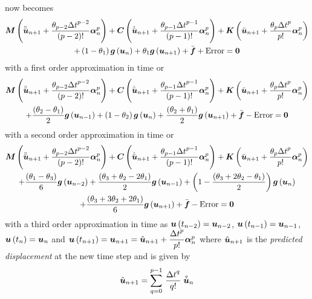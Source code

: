  now becomes
\begin{multline}
  \matr{M}\pbrac{\ddot{\bar{\vectr{u}}}_{n+1}+\dfrac{\theta_{p-2}{\Delta
        t}^{p-2}}{\factorial{p-2}}\vectr{\alpha}^{p}_{n}}+
  \matr{C}\pbrac{\dot{\bar{\vectr{u}}}_{n+1}+\dfrac{\theta_{p-1}{\Delta
        t}^{p-1}}{\factorial{p-1}}\vectr{\alpha}^{p}_{n}}
  +\matr{K}\pbrac{\bar{\vectr{u}}_{n+1}+\dfrac{\theta_{p}{\Delta
        t}^{p}}{p!}\vectr{\alpha}^{p}_{n}}\\
  +\pbrac{1-\theta_{1}}\fnof{\vectr{g}}{\vectr{u}_{n}}+\theta_{1}\fnof{\vectr{g}}{\vectr{u}_{n+1}}+\bar{\vectr{f}}+
  \text{Error}=\vectr{0}
  \label{eqn:firstorderdynamic2}
\end{multline}
with a first order approximation in time or 
\begin{multline}
  \matr{M}\pbrac{\ddot{\bar{\vectr{u}}}_{n+1}+\dfrac{\theta_{p-2}{\Delta
        t}^{p-2}}{\factorial{p-2}}\vectr{\alpha}^{p}_{n}}+
  \matr{C}\pbrac{\dot{\bar{\vectr{u}}}_{n+1}+\dfrac{\theta_{p-1}{\Delta
        t}^{p-1}}{\factorial{p-1}}\vectr{\alpha}^{p}_{n}}
  +\matr{K}\pbrac{\bar{\vectr{u}}_{n+1}+\dfrac{\theta_{p}{\Delta
        t}^{p}}{p!}\vectr{\alpha}^{p}_{n}}\\
  +\dfrac{\pbrac{\theta_{2}-\theta_{1}}}{2}\fnof{\vectr{g}}{\vectr{u}_{n-1}}+
  \pbrac{1-\theta_{2}}\fnof{\vectr{g}}{\vectr{u}_{n}}+
  \dfrac{\pbrac{\theta_{2}+\theta_{1}}}{2}\fnof{\vectr{g}}{\vectr{u}_{n+1}}+\bar{\vectr{f}}-
  \text{Error}=\vectr{0}
  \label{eqn:secondorderdynamic2}
\end{multline}
with a second order approximation in time or
\begin{multline}
  \matr{M}\pbrac{\ddot{\bar{\vectr{u}}}_{n+1}+\dfrac{\theta_{p-2}{\Delta
        t}^{p-2}}{\factorial{p-2}}\vectr{\alpha}^{p}_{n}}
  +\matr{C}\pbrac{\dot{\bar{\vectr{u}}}_{n+1}+\dfrac{\theta_{p-1}{\Delta
        t}^{p-1}}{\factorial{p-1}}\vectr{\alpha}^{p}_{n}}
  +\matr{K}\pbrac{\bar{\vectr{u}}_{n+1}+\dfrac{\theta_{p}{\Delta
        t}^{p}}{p!}\vectr{\alpha}^{p}_{n}}\\ +\dfrac{\pbrac{\theta_{1}-\theta_{3}}}{6}\fnof{\vectr{g}}{\vectr{u}_{n-2}}
  +\dfrac{\pbrac{\theta_{3}+\theta_{2}-2\theta_{1}}}{2}\fnof{\vectr{g}}{\vectr{u}_{n-1}}
  +\pbrac{1-\dfrac{\pbrac{\theta_{3}+2\theta_{2}-\theta_{1}}}{2}}\fnof{\vectr{g}}{\vectr{u}_{n}} \\
  +\dfrac{\pbrac{\theta_{3}+3\theta_{2}+2\theta_{1}}}{6}\fnof{\vectr{g}}{\vectr{u}_{n+1}}+\bar{\vectr{f}}-
  \text{Error}=\vectr{0}
  \label{eqn:thirdorderdynamic2}
\end{multline}
with a third order approximation in time as
$ \boldsymbol{u}\left( t_{n-2} \right) =\boldsymbol{u}_{n-2}$,
$ \boldsymbol{u}\left( t_{n-1} \right) =\boldsymbol{u}_{n-1}$,
$ \boldsymbol{u}\left( t_{n} \right) =\boldsymbol{u}_{n}$ and
$ \boldsymbol{u}\left( t_{n+1} \right) =\boldsymbol{u}_{n+1}=\hat{\boldsymbol{u}}_{n+1}+
\dfrac{{\Delta t}^{p}}{p!}\boldsymbol{\alpha}^{p}_{n}$ where
$\hat{\boldsymbol{u}}_{n+1}$ is the \emph{predicted displacement} at the new time
step and is given by
\begin{equation}
  \hat{\boldsymbol{u}}_{n+1}=  \displaystyle\sum_{q=0}^{p-1} \,\dfrac{{\Delta
        t}^{q}}{q!} \stackrel{\scriptscriptstyle q}{\boldsymbol{u}} _{n} 
\end{equation}


